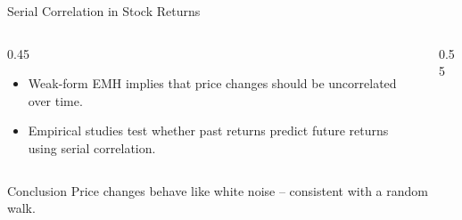 \begin{frame}{Serial Correlation in Stock Returns}
	
	\begin{columns}
		\begin{column}{0.45\textwidth}
			\begin{itemize}
				\item Weak-form EMH implies that price changes should be uncorrelated over time.
				\item Empirical studies test whether past returns predict future returns using serial correlation.
			\end{itemize}
		\end{column}
		\begin{column}{0.55\textwidth}
			
			\begin{table}[h]
				\centering
				\caption{Near-zero serial correlation supports weak-form efficiency.}
			\end{table}
		\end{column}
	\end{columns}
	
	\vspace{0.3cm}

	\begin{block}{Conclusion}
		\small
		Price changes behave like white noise -- consistent with a random walk.
	\end{block}
	
\end{frame}

